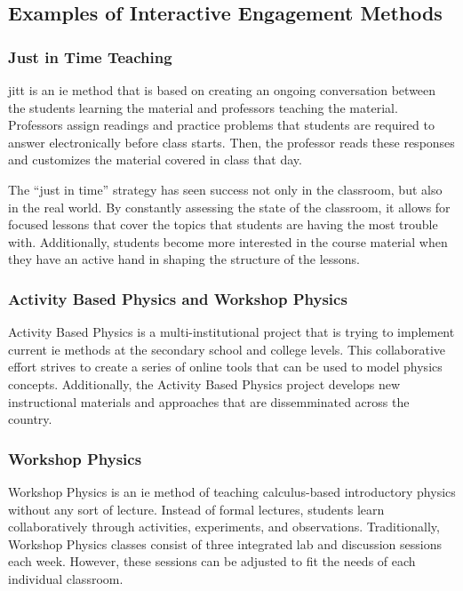 \subsection{Examples of Interactive Engagement Methods}

\subsubsection{Just in Time Teaching}

\gls{jitt} is an \gls{ie} method that is based on creating an ongoing conversation between the students learning the material and professors teaching the material. Professors assign readings and practice problems that students are required to answer electronically before class starts. Then, the professor reads these responses and customizes the material covered in class that day\cite{novak1999}.

The ``just in time'' strategy has seen success not only in the classroom, but also in the real world. By constantly assessing the state of the classroom, it allows for focused lessons that cover the topics that students are having the most trouble with. Additionally, students become more interested in the course material when they have an active hand in shaping the structure of the lessons\cite{novak1999}.

\subsubsection{Activity Based Physics and Workshop Physics}

Activity Based Physics is a multi-institutional project that is trying to implement current \gls{ie} methods at the secondary school and college levels. This collaborative effort strives to create a series of online tools that can be used to model physics concepts. Additionally, the Activity Based Physics project develops new instructional materials and approaches that are dissemminated across the country.

\subsubsection{Workshop Physics}

Workshop Physics is an \gls{ie} method of teaching calculus-based introductory physics without any sort of lecture. Instead of formal lectures, students learn collaboratively through activities, experiments, and observations. Traditionally, Workshop Physics classes consist of three integrated lab and discussion sessions each week. However, these sessions can be adjusted to fit the needs of each individual classroom.


